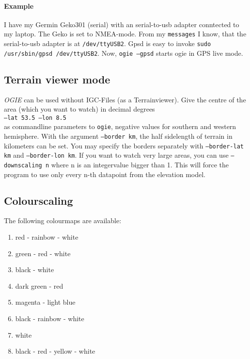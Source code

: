 \paragraph{Example}
I have my Germin Geko301 (serial) with an serial-to-usb adapter conntected to my laptop. The Geko is set to NMEA-mode. From my \texttt{messages} I know, that the serial-to-usb adapter is at \texttt{/dev/ttyUSB2}. Gpsd is easy to invoke \texttt{sudo /usr/sbin/gpsd /dev/ttyUSB2}.
Now, \texttt{ogie --gpsd} starts ogie in GPS live mode.









\subsection{Terrain viewer mode}

\emph{OGIE} can be used without IGC-Files (as a Terrainviewer).
Give the centre of the area (which you want to watch) in decimal degrees \\
\texttt{--lat 53.5  --lon 8.5} \\
as commandline parameters to \texttt{ogie}, negative values for southern and western  hemisphere.
With the argument \texttt{--border km}, the half sidelength of terrain in kilometers can be set. You may specify the borders separately with \texttt{--border-lat km}  and \texttt{--border-lon km}.
If you want to watch very large areas, you can use
\texttt{--downscaling n}
where n is an integervalue bigger than 1. This will force the program to use
only every n-th datapoint from the elevation model.



\subsection{Colourscaling}
\label{color}

The following colourmaps are available:

\begin{enumerate}
\item  red - rainbow - white
\item  green - red - white
\item  black - white
\item  dark green - red
\item  magenta - light blue
\item  black - rainbow - white
\item  white
\item  black - red - yellow - white
\end{enumerate}

